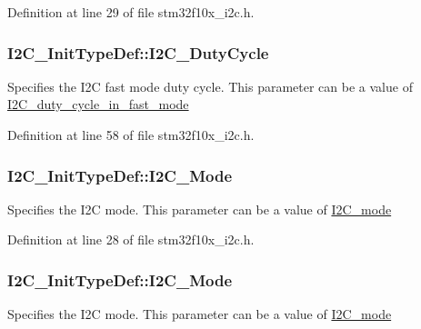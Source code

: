 Definition at line 29 of file stm32f10x\+\_\+i2c.\+h.

\subsubsection[{\texorpdfstring{I2\+C\+\_\+\+Duty\+Cycle}{I2C_DutyCycle}}]{ I2\+C\+\_\+\+Init\+Type\+Def\+::\+I2\+C\+\_\+\+Duty\+Cycle}\hypertarget{struct_i2_c___init_type_def_aff23b28652359513dfd268dee54c3279}{}\label{struct_i2_c___init_type_def_aff23b28652359513dfd268dee54c3279}
Specifies the I2C fast mode duty cycle. This parameter can be a value of \hyperlink{group___i2_c__duty__cycle__in__fast__mode}{I2\+C\+\_\+duty\+\_\+cycle\+\_\+in\+\_\+fast\+\_\+mode} 

Definition at line 58 of file stm32f10x\+\_\+i2c.\+h.

\subsubsection[{\texorpdfstring{I2\+C\+\_\+\+Mode}{I2C_Mode}}]{ I2\+C\+\_\+\+Init\+Type\+Def\+::\+I2\+C\+\_\+\+Mode}\hypertarget{struct_i2_c___init_type_def_aca395c806c120c0a1658ab303f2ca44c}{}\label{struct_i2_c___init_type_def_aca395c806c120c0a1658ab303f2ca44c}
Specifies the I2C mode. This parameter can be a value of \hyperlink{group___i2_c__mode}{I2\+C\+\_\+mode} 

Definition at line 28 of file stm32f10x\+\_\+i2c.\+h.

\subsubsection[{\texorpdfstring{I2\+C\+\_\+\+Mode}{I2C_Mode}}]{ I2\+C\+\_\+\+Init\+Type\+Def\+::\+I2\+C\+\_\+\+Mode}\hypertarget{struct_i2_c___init_type_def_ad5cf353c5b6968b3610b70ca593cec52}{}\label{struct_i2_c___init_type_def_ad5cf353c5b6968b3610b70ca593cec52}
Specifies the I2C mode. This parameter can be a value of \hyperlink{group___i2_c__mode}{I2\+C\+\_\+mode} 

